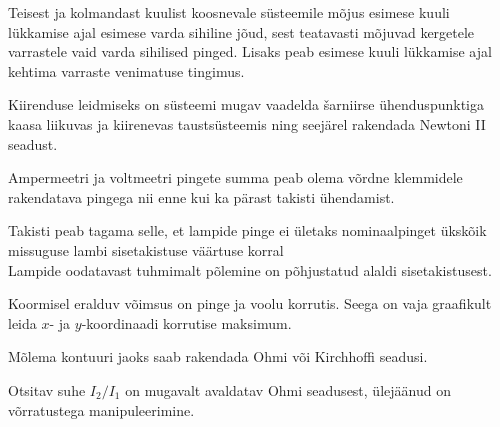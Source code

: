 \documentclass[10pt]{article}
\begin{document}
{
\hint
Teisest ja kolmandast kuulist koosnevale süsteemile mõjus esimese kuuli lükkamise ajal esimese varda sihiline jõud, sest teatavasti mõjuvad kergetele varrastele vaid varda sihilised pinged. Lisaks peab esimese kuuli lükkamise ajal kehtima varraste venimatuse tingimus.

Kiirenduse leidmiseks on süsteemi mugav vaadelda šarniirse ühenduspunktiga kaasa liikuvas ja kiirenevas taustsüsteemis ning seejärel rakendada Newtoni II seadust.
\probend
\bigskip


\hint
Ampermeetri ja voltmeetri pingete summa peab olema võrdne klemmidele rakendatava pingega nii enne kui ka pärast takisti ühendamist.
\probend
\bigskip


\hint
\osa Takisti peab tagama selle, et lampide pinge ei ületaks nominaalpinget ükskõik missuguse lambi sisetakistuse väärtuse korral\\
\osa Lampide oodatavast tuhmimalt põlemine on põhjustatud alaldi sisetakistusest.
\probend
\bigskip


\hint
Koormisel eralduv võimsus on pinge ja voolu korrutis. Seega on vaja graafikult leida $x$- ja $y$-koordinaadi korrutise maksimum.
\probend
\bigskip


\hint
Mõlema kontuuri jaoks saab rakendada Ohmi või Kirchhoffi
seadusi.
\probend
\bigskip


\hint
Otsitav suhe $I_2/I_1$ on mugavalt avaldatav Ohmi seadusest, ülejäänud on võrratustega manipuleerimine.
\probend
\bigskip


}
\end{document}
